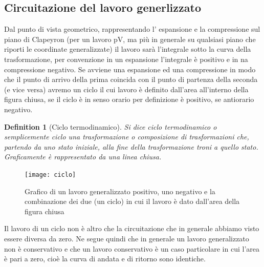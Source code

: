 \documentclass[10pt,a4paper]{article}
\newtheorem{definition}{Definition}
\begin{document}
\subsection{Circuitazione del lavoro generlizzato}
Dal punto di vista geometrico, rappresentando l' espansione e la compressione sul piano di Clapeyron (per un lavoro pV, ma più in generale su qualsiasi piano che riporti le coordinate generalizzate) il lavoro sarà l'integrale sotto la curva della trasformazione, per convenzione in un espansione l'integrale è positivo e in na compressione negativo. Se avviene una espansione ed una compressione in modo che il punto di arrivo della prima coincida con il punto di partenza della seconda (e vice versa) avremo un ciclo il cui lavoro è definito dall'area all'interno della figura chiusa, se il ciclo è in senso orario per definizione è positivo, se antiorario negativo. 
\begin{definition}[Ciclo termodinamico]
	Si dice ciclo termodinamico o semplicemente ciclo una trasformazione o composizione di trasformazioni che, partendo da uno stato iniziale, alla fine della trasformazione troni a quello stato. Graficamente è rappresentato da una linea chiusa. 
\end{definition}
\begin{figure}[h!]
	\centering
	\texttt{[image: ciclo]}
	\caption{Grafico di un lavoro generalizzato positivo, uno negativo e la combinazione dei due (un ciclo) in cui il lavoro è dato dall'area della figura chiusa}
	\label{fig:ciclo}
\end{figure}
\FloatBarrier
Il lavoro di un ciclo non è altro che la circuitazione che in generale abbiamo visto essere diversa da zero. Ne segue quindi che in generale un lavoro generalizzato non è conservativo e che un lavoro conservativo è un caso particolare in cui l'area è pari a zero, cioè la curva di andata e di ritorno sono identiche.
\end{document}
